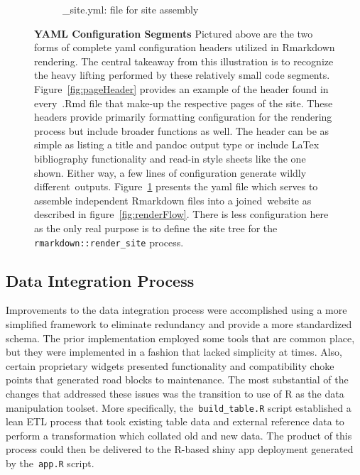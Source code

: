 \documentclass[10pt]{report}
\begin{document}
\begin{figure}
\begin{subfigure}[t]{.4\textwidth}
\caption{\_site.yml: file for site assembly}\label{fig:siteYaml}
\end{subfigure}
\caption[YAML Configuration Segments]{\textbf{YAML Configuration Segments} Pictured above are the two forms of complete yaml configuration headers utilized in Rmarkdown rendering. The central takeaway from this illustration is to recognize the heavy lifting performed by these relatively small code segments. Figure~\ref{fig:pageHeader} provides an example of the header found in every~.Rmd file that make-up the respective pages of the site. These headers provide primarily formatting configuration for the rendering process but include broader functions as well. The header can be as simple as listing a title and pandoc output type or include LaTex bibliography functionality and read-in style sheets like the one shown. Either way, a few lines of configuration generate wildly different outputs. Figure~\ref{fig:siteYaml} presents the yaml file which serves to assemble independent Rmarkdown files into a joined website as described in figure~\ref{fig:renderFlow}. There is less configuration here as the only real purpose is to define the site tree for the \texttt{rmarkdown::render\_site} process.}\label{fig:yamls}
\end{figure}

\subsection{Data Integration Process}

Improvements to the data integration process were accomplished using a more simplified framework to eliminate redundancy and provide a more standardized schema. The prior implementation employed some tools that are common place, but they were implemented in a fashion that lacked simplicity at times. Also, certain proprietary widgets presented functionality and compatibility choke points that generated road blocks to maintenance. The most substantial of the changes that addressed these issues was the transition to use of R as the data manipulation toolset. More specifically, the~\texttt{build\_table.R} script established a lean ETL process that took existing table data and external reference data to perform a transformation which collated old and new data. The product of this process could then be delivered to the R-based shiny app deployment generated by the~\texttt{app.R} script.
\end{document}
